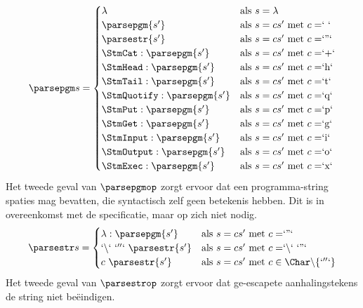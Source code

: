 $$
	\parsepgm s =
		\begin{cases}
			\lambda & \text{als $s=\lambda$}\\
            \parsepgm{s'} & \text{als $s=cs'$ met $c=$` `}\\
            \parsestr{s'} & \text{als $s=cs'$ met $c=$`''`}\\
            \StmCat:\parsepgm{s'} & \text{als $s=cs'$ met $c=$`+`}\\
            \StmHead:\parsepgm{s'} & \text{als $s=cs'$ met $c=$`h`}\\
            \StmTail:\parsepgm{s'} & \text{als $s=cs'$ met $c=$`t`}\\
            \StmQuotify:\parsepgm{s'} & \text{als $s=cs'$ met $c=$`q`}\\
            \StmPut:\parsepgm{s'} & \text{als $s=cs'$ met $c=$`p`}\\
            \StmGet:\parsepgm{s'} & \text{als $s=cs'$ met $c=$`g`}\\
            \StmInput:\parsepgm{s'} & \text{als $s=cs'$ met $c=$`i`}\\
            \StmOutput:\parsepgm{s'} & \text{als $s=cs'$ met $c=$`o`}\\
			\StmExec:\parsepgm{s'} & \text{als $s=cs'$ met $c=$`x`}\\
		\end{cases}
$$
Het tweede geval van $\parsepgmop$ zorgt ervoor dat een programma-string spaties mag bevatten, die syntactisch zelf geen betekenis hebben. Dit is in overeenkomst met de specificatie, maar op zich niet nodig.
$$
	\parsestr s =
		\begin{cases}
			\lambda:\parsepgm{s'} & \text{als $s=cs'$ met $c=$`''`}\\
            `\backslash`~`''`~\parsestr{s'} & \text{als $s=cs'$ met $c=$`$\backslash$`~`''`}\\
            c~\parsestr{s'} & \text{als $s=cs'$ met $c \in\Char\backslash\{`''`\}$}\\
		\end{cases}
$$
Het tweede geval van $\parsestrop$ zorgt ervoor dat ge-escapete aanhalingstekens de string niet beëindigen.

